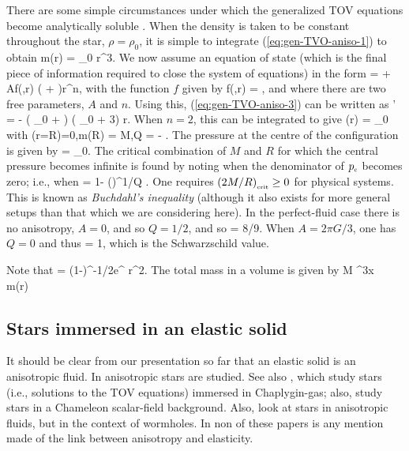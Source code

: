 There are some simple circumstances under which the generalized TOV equations become analytically soluble \cite{1974ApJ...188..657B}. When the density is taken to be constant throughout the star, $\rho = \rho_0$, it is simple to integrate (\ref{eq:gen-TVO-aniso-1}) to obtain 
\bea
m(r) = \rho_0 r^3.
\eea
 We now assume an equation of state (which is the final piece of information required to close the system of equations) in the form
\bse
\bea
{} =  + Af(,r) \left( \rho + \right)r^n,
\eea
with the function $f$ given by
\bea
f(,r) = ,
\eea
\ese
and where there are two free parameters, $A$ and $n$. Using this,  (\ref{eq:gen-TVO-aniso-3}) can be written as
\bea
{}' = - \left( \rho_0 + \right) \left( \rho_0 + 3\right)  r.
\eea
When $n=2$, this can be integrated to give
\bea
{}(r) = \rho_0 
\eea
with
\bea
{}(r=R)=0,\qquad m(R) = M,\qquad Q = \half - .
\eea
The pressure at the centre of the configuration is given by
\bea
{} = \rho_0.
\eea
The critical combination of $M$ and $R$ for which the central pressure becomes infinite is found  by noting when the denominator of ${p}_{\scriptscriptstyle{\textrm{c}}}$ becomes zero; i.e., when
\bea
{} = 1- \left(\right)^{1/Q} .
\eea
One requires ${\left(2M/R\right)}_{\scriptscriptstyle{\textrm{crit}}}\geq 0$ for physical systems. This is known as \textit{Buchdahl's inequality} \cite{PhysRev.116.1027, 1964ApJ...140..434T} (although it also exists for more general setups than that which we are considering here). In the perfect-fluid case there is no anisotropy, $A = 0$, and so $Q= 1/2$, and so
\bea
{} = 8/9.
\eea
When $A = 2\pi G /3$, one has $Q=0$ and thus
\bea
{} = 1,
\eea
which is the Schwarzschild value.

Note that 
\bea
{} = \left(1-\right)^{-1/2}e^{\nu} r^2\sin\theta.
\eea
The total mass in a volume is given by
\bea
M  \int \dd^3x\, \, m(r) 
\eea

\subsection{Stars immersed in an elastic solid}
It should be clear from our presentation so far that an elastic solid is an anisotropic fluid. In \cite{1974ApJ...188..657B, Dev:2000gt, Mak:2001eb, Dev:2003qd, Das:2003wm} anisotropic stars are studied. See also \cite{Gorini:2008zj, Gorini:2009em}, which study stars (i.e., solutions to the TOV equations) immersed in Chaplygin-gas; also, \cite{Folomeev:2013hoa} study stars in a Chameleon scalar-field background. Also, \cite{Dzhunushaliev:2014mza} look at stars in anisotropic fluids, but in the context of wormholes. In non of these papers is any mention made of the link between anisotropy and elasticity.

